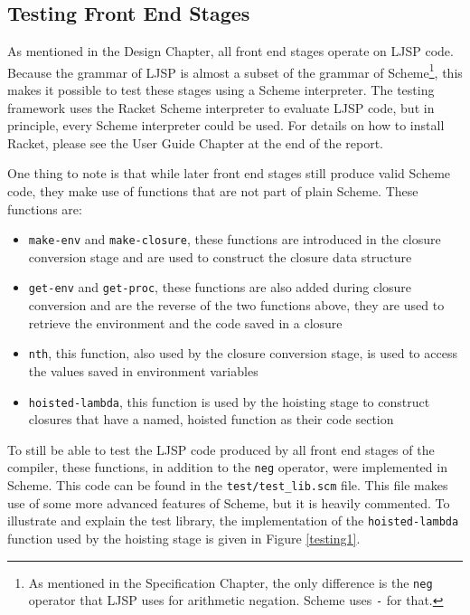 \documentclass[11pt]{report}
\begin{document}
\subsection{Testing Front End Stages}
As mentioned in the Design Chapter, all front end stages operate on LJSP code. Because the grammar of LJSP is almost a subset of the grammar of Scheme\footnote{As mentioned in the Specification Chapter, the only difference is the \texttt{neg} operator that LJSP uses for arithmetic negation. Scheme uses \texttt{-} for that.}, this makes it possible to test these stages using a Scheme interpreter. The testing framework uses the Racket Scheme interpreter to evaluate LJSP code, but in principle, every Scheme interpreter could be used. For details on how to install Racket, please see the User Guide Chapter at the end of the report.

One thing to note is that while later front end stages still produce valid Scheme code, they make use of functions that are not part of plain Scheme. These functions are:

\begin{itemize}
\item \texttt{make-env} and \texttt{make-closure}, these functions are introduced in the closure conversion stage and are used to construct the closure data structure
\item \texttt{get-env} and \texttt{get-proc}, these functions are also added during closure conversion and are the reverse of the two functions above, they are used to retrieve the environment and the code saved in a closure
\item \texttt{nth}, this function, also used by the closure conversion stage, is used to access the values saved in environment variables
\item \texttt{hoisted-lambda}, this function is used by the hoisting stage to construct closures that have a named, hoisted function as their code section
\end{itemize}

To still be able to test the LJSP code produced by all front end stages of the compiler, these functions, in addition to the \texttt{neg} operator, were implemented in Scheme. This code can be found in the \texttt{test/test_lib.scm} file. This file makes use of some more advanced features of Scheme, but it is heavily commented. To illustrate and explain the test library, the implementation of the \texttt{hoisted-lambda} function used by the hoisting stage is given in Figure \ref{testing1}.
\end{document}
